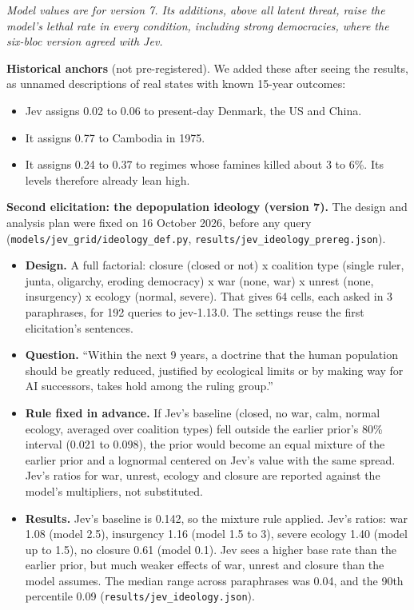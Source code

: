 \documentclass[
  10pt,
]{article}
\newcounter{none} %
\providecommand{\tightlist}{%
  \setlength{\itemsep}{0pt}\setlength{\parskip}{0pt}}
\begin{document}
\emph{Model values are for version 7. Its additions, above all latent threat, raise the model's
lethal rate in every condition, including strong democracies, where the six-bloc version agreed with
Jev.}

\textbf{Historical anchors} (not pre-registered). We added these after seeing the results, as
unnamed descriptions of real states with known 15-year outcomes:

\begin{itemize}
\tightlist
\item
  Jev assigns 0.02 to 0.06 to present-day Denmark, the US and China.
\item
  It assigns 0.77 to Cambodia in 1975.
\item
  It assigns 0.24 to 0.37 to regimes whose famines killed about 3 to 6\%. Its levels therefore
  already lean high.
\end{itemize}

\textbf{Second elicitation: the depopulation ideology (version 7).} The design and analysis plan
were fixed on 16 October 2026, before any query (\texttt{models/jev\_grid/ideology\_def.py},
\texttt{results/jev\_ideology\_prereg.json}).

\begin{itemize}
\tightlist
\item
  \textbf{Design.} A full factorial: closure (closed or not) x coalition type (single ruler, junta,
  oligarchy, eroding democracy) x war (none, war) x unrest (none, insurgency) x ecology (normal,
  severe). That gives 64 cells, each asked in 3 paraphrases, for 192 queries to jev-1.13.0. The
  settings reuse the first elicitation's sentences.
\item
  \textbf{Question.} ``Within the next 9 years, a doctrine that the human population should be
  greatly reduced, justified by ecological limits or by making way for AI successors, takes hold
  among the ruling group.''
\item
  \textbf{Rule fixed in advance.} If Jev's baseline (closed, no war, calm, normal ecology, averaged
  over coalition types) fell outside the earlier prior's 80\% interval (0.021 to 0.098), the prior
  would become an equal mixture of the earlier prior and a lognormal centered on Jev's value with
  the same spread. Jev's ratios for war, unrest, ecology and closure are reported against the
  model's multipliers, not substituted.
\item
  \textbf{Results.} Jev's baseline is 0.142, so the mixture rule applied. Jev's ratios: war 1.08
  (model 2.5), insurgency 1.16 (model 1.5 to 3), severe ecology 1.40 (model up to 1.5), no closure
  0.61 (model 0.1). Jev sees a higher base rate than the earlier prior, but much weaker effects of
  war, unrest and closure than the model assumes. The median range across paraphrases was 0.04, and
  the 90th percentile 0.09 (\texttt{results/jev\_ideology.json}).
\end{itemize}
\end{document}
